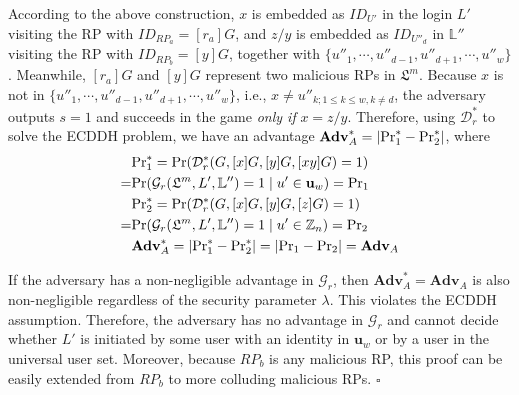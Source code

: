 According to the above construction, %
$x$ is embedded as $ID_{U'}$ in the login $L'$ visiting the RP with $ID_{RP_{a}} = [r_{a}]G$,
and $z/y$ is embedded as $ID_{U''_d}$ in $\mathbb{L}''$ visiting the RP with $ID_{RP_{b}}=[y]G$,
together with $\{u''_1, \cdots, u''_{d-1}, u''_{d+1}, \cdots, u''_w\}$.
Meanwhile, $[r_{a}]G$ and $[y]G$ represent two malicious RPs in $\mathfrak{L}^m$.
Because $x$ is not in $\{u''_1, \cdots, u''_{d-1}, u''_{d+1}, \cdots, u''_w\}$, i.e., $x \neq u''_{k; 1\leq k \leq w, k \neq d}$, the adversary outputs $s=1$ and succeeds in the game \emph{only if} $x = z/y$.
 Therefore, using $\mathcal{D}^*_r$ to solve the ECDDH problem, we have an advantage $\mathbf{Adv}^*_{A}=|{\rm Pr}^*_1 - {\rm Pr}^*_2|$, where
\begin{align*}
&{\rm Pr}^*_1 =  {\rm Pr}(\mathcal{D}^*_r(G, [x]G, [y]G, [xy]G)=1) \\
=&{\rm Pr}(\mathcal{G}_r(\mathfrak{L}^m, L', \mathbb{L}'')=1 \; | \; u' \in \mathbf{u}_w) = {\rm Pr}_1 \\
&{\rm Pr}^*_2= {\rm Pr}(\mathcal{D}^*_r(G, [x]G, [y]G, [z]G)=1) \\
=&{\rm Pr}(\mathcal{G}_r(\mathfrak{L}^m, L', \mathbb{L}'')=1 \; | \; u' \in \mathbb{Z}_n) = {\rm Pr}_2 \\
&\mathbf{Adv}^*_{A}=|{\rm Pr}^*_1-{\rm Pr}^*_2|=|{\rm Pr}_1-{\rm Pr}_2|={\mathbf{Adv}}_{A}
\end{align*}

If the adversary has a non-negligible advantage in $\mathcal{G}_r$, then $\mathbf{Adv}^*_{A}={\mathbf{Adv}}_{A}$ is also non-negligible regardless of the security parameter $\lambda$. This violates the ECDDH assumption. Therefore, the adversary has no advantage in $\mathcal{G}_r$ and cannot decide whether $L'$ is initiated by some user with an identity in $\mathbf{u}_w$ or by a user in the universal user set.
Moreover, because $RP_b$ is any malicious RP, this proof can be easily extended from $RP_b$ to more colluding malicious RPs.
\hfill $\square$

\oldc

